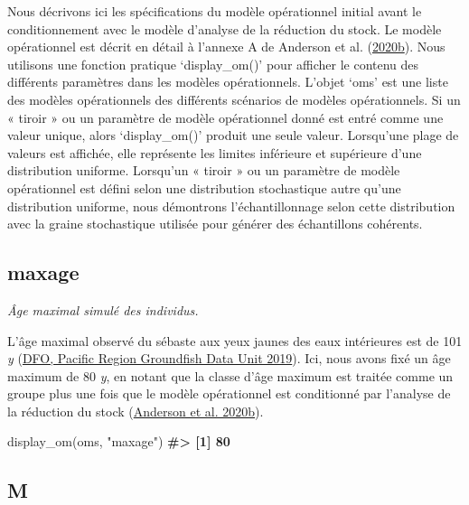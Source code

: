 \documentclass[french,11pt]{book}
\newenvironment{Shaded}{\begin{snugshade}}{\end{snugshade}}
\newcommand{\CommentTok}[1]{\textcolor[rgb]{0.56,0.35,0.01}{\textbf{#1}}}
\newcommand{\FunctionTok}[1]{\textcolor[rgb]{0.00,0.00,0.00}{#1}}
\newcommand{\NormalTok}[1]{#1}
\newcommand{\StringTok}[1]{\textcolor[rgb]{0.31,0.60,0.02}{#1}}
\begin{document}
Nous décrivons ici les spécifications du modèle opérationnel initial avant le conditionnement avec le modèle d'analyse de la réduction du stock. Le modèle opérationnel est décrit en détail à l'annexe A de Anderson et al. (\protect\hyperlink{ref-anderson2020gfmp}{2020b}). Nous utilisons une fonction pratique `display\_om()' pour afficher le contenu des différents paramètres dans les modèles opérationnels. L'objet `oms' est une liste des modèles opérationnels des différents scénarios de modèles opérationnels. Si un « tiroir » ou un paramètre de modèle opérationnel donné est entré comme une valeur unique, alors `display\_om()' produit une seule valeur. Lorsqu'une plage de valeurs est affichée, elle représente les limites inférieure et supérieure d'une distribution uniforme. Lorsqu'un « tiroir » ou un paramètre de modèle opérationnel est défini selon une distribution stochastique autre qu'une distribution uniforme, nous démontrons l'échantillonnage selon cette distribution avec la graine stochastique utilisée pour générer des échantillons cohérents.

\label{app:desc-stock-yelloweye}

\subsection{maxage}
\label{app:desc-stock-maxage-yelloweye}

\emph{Âge maximal simulé des individus. }

L'âge maximal observé du sébaste aux yeux jaunes des eaux intérieures est de 101 \emph{y} (\protect\hyperlink{ref-databases2019}{DFO, Pacific Region Groundfish Data Unit 2019}). Ici, nous avons fixé un âge maximum de 80 \emph{y}, en notant que la classe d'âge maximum est traitée comme un groupe plus une fois que le modèle opérationnel est conditionné par l'analyse de la réduction du stock (\protect\hyperlink{ref-anderson2020gfmp}{Anderson et al. 2020b}).
\begin{Shaded}
\begin{Highlighting}[]
\FunctionTok{display\_om}\NormalTok{(oms, }\StringTok{"maxage"}\NormalTok{)}
\CommentTok{\#\textgreater{} [1] 80}
\end{Highlighting}
\end{Shaded}
\subsection{M}
\label{app:desc-stock-m-yelloweye}
\end{document}
